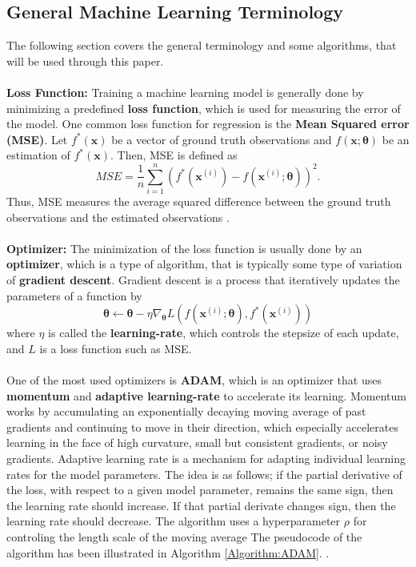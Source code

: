\documentclass[./main.tex]{subfiles}
\begin{document}
\subsection{General Machine Learning Terminology}
The following section covers the general terminology and some algorithms, that will be used through this paper. 
\\
\\
\noindent \textbf{Loss Function:} Training a machine learning model is generally done by minimizing a predefined \textbf{loss function}, which is used for measuring the error of the model. One common loss function for regression is the \textbf{Mean Squared error (MSE)}. Let $f^*(\bm{x})$ be a vector of ground truth observations and $f(\bm{x}; \bm{\theta})$ be an estimation of $f^*(\bm{x})$. Then, MSE is defined as
\begin{equation}
    MSE = \frac{1}{n} \sum_{i = 1} ^n \left( f^*\left(\bm{x}^{(i)}\right) - f\left(\bm{x}^{(i)}; \bm{\theta}\right)\right)^2.
\end{equation}
Thus, MSE measures the average squared difference between the ground truth observations and the estimated observations \cite{ISL}.
\\
\\
\noindent \textbf{Optimizer:} The minimization of the loss function is usually done by an \textbf{optimizer}, which is a type of algorithm, that is typically some type of variation of \textbf{gradient descent}. Gradient descent is a process that iteratively updates the parameters of a function by
\begin{equation}
    \bm{\theta} \leftarrow \bm{\theta} - \eta \nabla_{\bm{\theta}} L\left( f\left(\bm{x}^{(i)}; \bm{\theta}\right), f^*\left(\bm{x}^{(i)}\right) \right)
\end{equation}
where $\eta$ is called the \textbf{learning-rate}, which controls the stepsize of each update, and $L$ is a loss function such as MSE.
\\
\\
One of the most used optimizers is \textbf{ADAM}, which is an optimizer that uses \textbf{momentum} and \textbf{adaptive learning-rate} to accelerate its learning. Momentum works by accumulating an exponentially decaying moving average of past gradients and continuing to move in their direction, which especially accelerates learning in the face of high curvature, small but consistent gradients, or noisy gradients. Adaptive learning rate is a mechanism for adapting individual learning rates for the model parameters. The idea is as follows; if the partial derivative of the loss, with respect to a given model parameter, remains the same sign, then the learning rate should increase. If that partial derivate changes sign, then the learning rate should decrease. The algorithm uses a hyperparameter $\rho$ for controling the length scale of the moving average The pseudocode of the algorithm has been illustrated in Algorithm \ref{Algorithm:ADAM}. \cite{DL_book}. 
\end{document}
